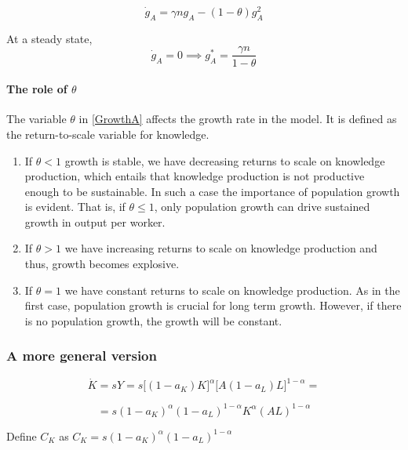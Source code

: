 \begin{equation*}
    \Dot{g}_{A}=\gamma n g_{A}-(1-\theta)g_{A}^2
\end{equation*}

At a steady state, 
\begin{equation}\label{GrowthA}
    \Dot{g}_{A}=0 \implies g_{A}^*=\frac{\gamma n}{1-\theta}
\end{equation}

\paragraph{The role of $\theta$}
The variable $\theta$ in \ref{GrowthA} affects the growth rate in the model. It is defined as the return-to-scale variable for knowledge. 

\begin{enumerate}
    \item If $\theta<1$ growth is stable, we have decreasing returns to scale on knowledge production, which entails that knowledge production is not productive enough to be sustainable.     In such a case the importance of population growth is evident. That is, if $\theta \leq 1$, only population growth can drive sustained growth in output per worker. 

    \item If $\theta > 1$ we have increasing returns to scale on knowledge production and thus,  growth becomes explosive. 
    \item If $\theta =  1$ we have constant returns to scale on knowledge production. As in the first case, population growth is crucial for long term growth. However, if there is no population growth, the growth will be constant. 
\end{enumerate}



\subsubsection{A more general version}

\begin{equation*}
    \Dot{K}=sY=s\big[ (1-a_{K})K \big]^\alpha \big[A(1-a_{L})L\big]^{1-\alpha}=
\end{equation*}

\begin{equation*}
    =s(1-a_{K})^\alpha(1-a_{L})^{1-\alpha}K^\alpha(AL)^{1-\alpha}
\end{equation*}

Define $C_{K}$ as $C_{K}=s(1-a_{K})^\alpha(1-a_{L})^{1-\alpha}$


